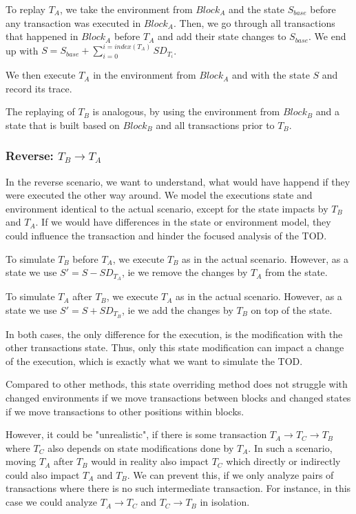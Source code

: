 \documentclass[draft,final]{vutinfth} %
\begin{document}
To replay $T_A$, we take the environment from $Block_A$ and the state $S_{base}$ before any transaction was executed in $Block_A$. Then, we go through all transactions that happened in $Block_A$ before $T_A$ and add their state changes to $S_{base}$. We end up with $S = S_{base} + \sum_{i=0}^{i=index(T_A)}SD_{T_i}$.

We then execute $T_A$ in the environment from $Block_A$ and with the state $S$ and record its trace.

The replaying of $T_B$ is analogous, by using the environment from $Block_B$ and a state that is built based on $Block_B$ and all transactions prior to $T_B$.

\subsubsection{Reverse: $T_B \rightarrow T_A$}

In the reverse scenario, we want to understand, what would have happend if they were executed the other way around. We model the executions state and environment identical to the actual scenario, except for the state impacts by $T_B$ and $T_A$. If we would have differences in the state or environment model, they could influence the transaction and hinder the focused analysis of the TOD.

To simulate $T_B$ before $T_A$, we execute $T_B$ as in the actual scenario. However, as a state we use $S\prime = S - SD_{T_A}$, ie we remove the changes by $T_A$ from the state.

To simulate $T_A$ after $T_B$, we execute $T_A$ as in the actual scenario. However, as a state we use $S\prime = S + SD_{T_B}$, ie we add the changes by $T_B$ on top of the state.

In both cases, the only difference for the execution, is the modification with the other transactions state. Thus, only this state modification can impact a change of the execution, which is exactly what we want to simulate the TOD.

Compared to other methods, this state overriding method does not struggle with changed environments if we move transactions between blocks and changed states if we move transactions to other positions within blocks.

However, it could be "unrealistic", if there is some transaction $T_A \rightarrow T_C \rightarrow T_B$ where $T_C$ also depends on state modifications done by $T_A$. In such a scenario, moving $T_A$ after $T_B$ would in reality also impact $T_C$ which directly or indirectly could also impact $T_A$ and $T_B$. We can prevent this, if we only analyze pairs of transactions where there is no such intermediate transaction. For instance, in this case we could analyze $T_A \rightarrow T_C$ and $T_C \rightarrow T_B$ in isolation.
\end{document}
